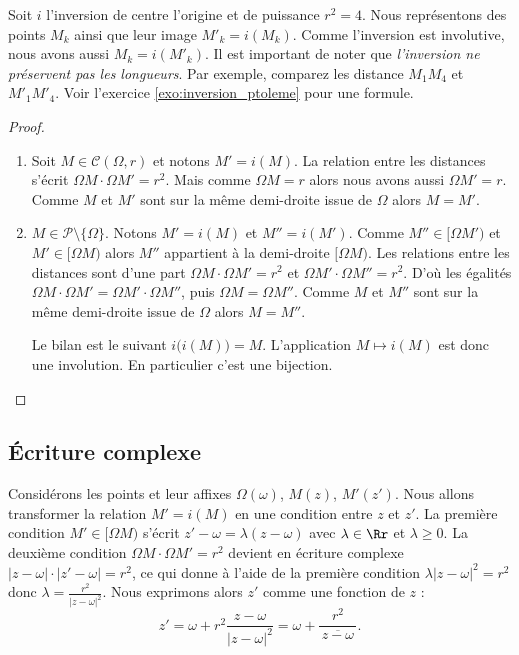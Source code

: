 \documentclass[11pt,class=report,crop=false]{standalone}
\newcommand{\inversion}{i}
\begin{document}
\begin{exemple}
Soit $\inversion$ l'inversion de centre l'origine et de puissance $r^2=4$. 
Nous représentons des points $M_k$ ainsi que leur image $M'_k=\inversion(M_k)$.
Comme l'inversion est involutive, nous avons aussi $M_k=\inversion(M'_k)$.
Il est important de noter que \emph{l'inversion ne préservent pas les longueurs}.
Par exemple, comparez les distance $M_1M_4$ et $M'_1 M'_4$.
Voir l'exercice \ref{exo:inversion_ptoleme} pour une formule.
\end{exemple}

\begin{proof}~
\begin{enumerate}
  \item Soit $M \in \mathcal{C}(\Omega,r)$ et notons $M' = \inversion(M)$.
  La relation entre les distances s'écrit $\Omega M \cdot \Omega M' = r^2$.
  Mais comme $\Omega M=r$ alors nous avons aussi $\Omega M' = r$. Comme $M$ et $M'$
  sont sur la même demi-droite issue de $\Omega$ alors $M=M'$.
  
  \item $M \in \mathcal{P} \setminus \{\Omega\}$. Notons $M' = \inversion(M)$ et $M'' = \inversion(M')$.
  Comme $M'' \in [\Omega M')$ et $M' \in [\Omega M)$ alors $M''$ appartient à la demi-droite $[\Omega M)$.
  Les relations entre les distances sont d'une part $\Omega M \cdot \Omega M' = r^2$
  et $\Omega M' \cdot \Omega M'' = r^2$. D'où les égalités $\Omega M \cdot \Omega M' = \Omega M' \cdot \Omega M''$,
  puis $\Omega M=\Omega M''$. Comme $M$ et $M''$ sont sur la même demi-droite issue de $\Omega$ alors $M=M''$.
  
  Le bilan est le suivant $\inversion\big(\inversion(M)\big) = M$. L'application $M \mapsto \inversion(M)$ est donc une involution.
  En particulier c'est une bijection.
\end{enumerate}

\end{proof}
\subsection{\'Ecriture complexe}

Considérons les points et leur affixes $\Omega(\omega)$, $M(z)$, $M'(z')$.
Nous allons transformer la relation $M'= \inversion (M)$ en une condition entre $z$ et $z'$.
La première condition $M' \in [\Omega M)$ s'écrit $z'-\omega= \lambda(z-\omega)$ avec $\lambda \in \Rr$ 
et $\lambda \ge 0$.
La deuxième condition $\Omega M \cdot \Omega M' = r^2$ devient en écriture complexe 
$|z-\omega|\cdot|z'-\omega| = r^2$, ce qui donne à l'aide de la première condition
$\lambda |z-\omega|^2 = r^2$ donc $\lambda = \frac{r^2}{|z-\omega|^2}$.
Nous exprimons alors $z'$ comme une fonction de $z$ :
$$z'= \omega + r^2 \frac{z-\omega}{|z-\omega|^2} = \omega + \frac{r^2}{\,\overline{z-\omega}\,}.$$
\end{document}

